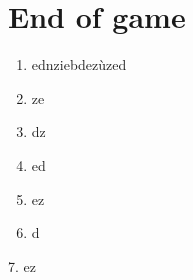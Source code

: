 \documentclass{article}%
\begin{document}
%
\section{ End of game
}%
\label{sec:Endofgame}%
\begin{enumerate}%
\item%
%
 ednziebdezùzed
%
\item%
%
 ze
%
\item%
%
 dz
%
\item%
%
 ed
%
\item%
%
 ez
%
\item%
%
 d
%
\end{enumerate}%
7. ez

%
\end{document}
